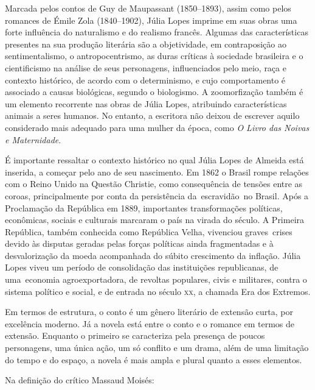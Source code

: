 Marcada pelos contos de Guy de Maupassant (1850--1893), assim como pelos
romances de Émile Zola (1840--1902), Júlia Lopes imprime em suas obras
uma forte influência do naturalismo e do realismo francês. Algumas das
características presentes na sua produção literária são a objetividade,
em contraposição ao sentimentalismo, o antropocentrismo, as duras
críticas à sociedade brasileira e o cientificismo na análise de seus
personagens, influenciados pelo meio, raça e contexto histórico, de
acordo com o determinismo, e cujo comportamento é associado a causas
biológicas, segundo o biologismo. A zoomorfização também é um elemento
recorrente nas obras de Júlia Lopes, atribuindo características animais
a seres humanos. No entanto, a escritora não deixou de escrever aquilo
considerado mais adequado para uma mulher da época, como \emph{O Livro
das Noivas e Maternidade}.

É importante ressaltar o contexto histórico no qual Júlia Lopes de
Almeida está inserida, a começar pelo ano de seu nascimento. Em 1862 o
Brasil rompe relações com o Reino Unido na Questão Christie, como
consequência de tensões entre as coroas, principalmente por conta da
persistência da~escravidão~no Brasil. Após a Proclamação da República em
1889, importantes transformações políticas, econômicas, sociais e
culturais marcaram o país na virada do século. A Primeira República,
também conhecida como República Velha, vivenciou graves~crises devido às
disputas geradas pelas forças políticas ainda fragmentadas e à
desvalorização da moeda acompanhada do súbito crescimento da inflação.
Júlia Lopes viveu um período de consolidação das instituições
republicanas, de uma~economia agroexportadora, de revoltas populares,
civis e militares, contra o sistema político e social, e de entrada no
século \textsc{xx}, a chamada Era dos Extremos.

Em termos de estrutura, o conto é um gênero literário de extensão curta, por excelência moderno. Já a novela está entre o conto e o
romance em termos de extensão. Enquanto o primeiro se caracteriza pela
presença de poucos personagens, uma única ação, um só conflito e um
drama, além de uma limitação do tempo e do espaço, a novela é mais ampla
e plural quanto a esses elementos.

Na definição do crítico Massaud Moisés:

